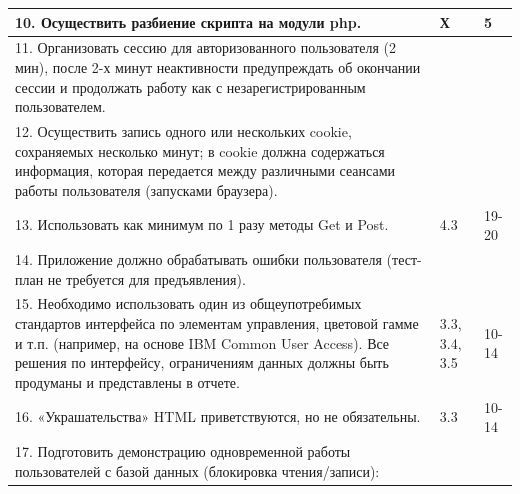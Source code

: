 \documentclass[a4paper,12pt]{article}
\begin{document}
\begin{longtable}{|p{7cm}|p{3cm}|p{3cm}|}
    \hline
    10. Осуществить разбиение скрипта на модули php.                                                      & Х                                    & 5                                                                                       \\
    \hline
    11. Организовать сессию для авторизованного пользователя (2 мин),
    после 2-х минут неактивности предупреждать об окончании сессии и
    продолжать работу как с незарегистрированным пользователем.                                           &                                      &                                                                                         \\
    \hline
    12. Осуществить запись одного или нескольких cookie, сохраняемых несколько минут;
    в cookie должна содержаться информация, которая передается между
    различными сеансами работы пользователя (запусками браузера).                                         &                                      &                                                                                         \\
    \hline
    13. Использовать как минимум по 1 разу методы Get и Post.                                             & 4.3                                  & 19-20                                                                                   \\
    \hline
    14. Приложение должно обрабатывать ошибки пользователя
    (тест-план не требуется для предъявления).                                                            &                                      &                                                                                         \\
    \hline
    15. Необходимо использовать один из общеупотребимых стандартов интерфейса по элементам управления,
    цветовой гамме и т.п. (например, на основе IBM Common User Access). Все решения по интерфейсу,
    ограничениям данных должны быть продуманы и представлены в отчете.                                    & 3.3, 3.4, 3.5                        & 10-14                                                                                   \\
    \hline
    16. «Украшательства» HTML приветствуются, но не обязательны.                                          & 3.3                                  & 10-14                                                                                   \\
    \hline
    17. Подготовить демонстрацию одновременной работы пользователей с базой данных (блокировка чтения/записи):

\end{longtable}
\end{document}
